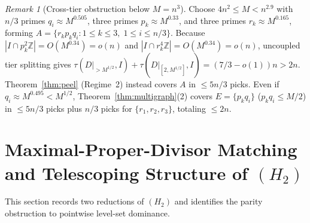 \documentclass[11pt]{article}
\theoremstyle{remark}
\newtheorem{remark}[theorem]{Remark}
\begin{document}
\begin{remark}[Cross-tier obstruction below $M = n^3$]
\label{rem:tier}
Choose $4 n^2 \le M < n^{2.9}$ with $n / 3$ primes $q_i \approx M^{0.505}$, three primes $p_k \approx M^{0.33}$, and three primes $r_k \approx M^{0.165}$, forming $A = \{r_k p_k q_i : 1 \le k \le 3, \; 1 \le i \le n / 3\}$. Because $|I \cap p_k^2 \mathbb{Z}| = O(M^{0.34}) = o(n)$ and $|I \cap r_k^4 \mathbb{Z}| = O(M^{0.34}) = o(n)$, uncoupled tier splitting gives $\tau(D|_{> M^{1/2}}, I) + \tau(D|_{[2, M^{1/2}]}, I) = (7/3 - o(1)) n > 2 n$. Theorem~\ref{thm:peel} (Regime~2) instead covers $A$ in $\le 5 n / 3$ picks. Even if $q_i \approx M^{0.495} < M^{1/2}$, Theorem~\ref{thm:multigraph}(2) covers $E = \{p_k q_i\}$ ($p_k q_i \le M / 2$) in $\le 5 n / 3$ picks plus $n / 3$ picks for $\{r_1, r_2, r_3\}$, totaling $\le 2 n$.
\end{remark}

\section{Maximal-Proper-Divisor Matching and Telescoping Structure of $(H_2)$}

This section records two reductions of $(H_2)$ and identifies the parity obstruction to pointwise level-set dominance.
\end{document}
